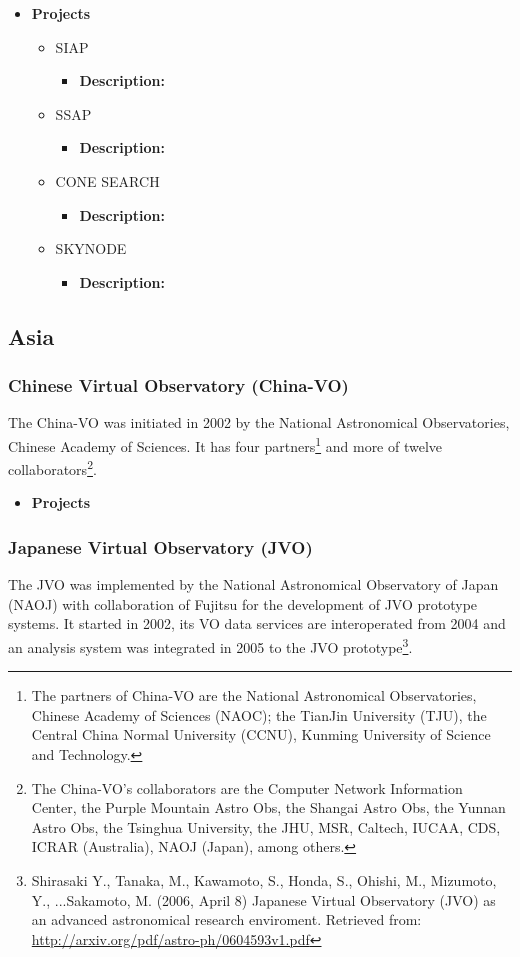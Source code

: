 \begin{itemize}
\item \textbf{Projects}
\begin{itemize}
\item SIAP
\begin{itemize}
\item \textbf{Description:} 
\end{itemize}
\item SSAP
\begin{itemize}
\item \textbf{Description:} 
\end{itemize}
\item CONE SEARCH
\begin{itemize}
\item \textbf{Description:} 
\end{itemize}
\item SKYNODE
\begin{itemize}
\item \textbf{Description:} 
\end{itemize}
\end{itemize}
\end{itemize}

\subsection{Asia}
\subsubsection{Chinese Virtual Observatory (China-VO)}
The China-VO was initiated in 2002 by the National Astronomical Observatories,
Chinese Academy of Sciences. It has four partners\footnote{The partners of
China-VO are the National Astronomical Observatories, Chinese Academy of
Sciences (NAOC); the TianJin University (TJU), the Central China Normal
University (CCNU), Kunming University of Science and Technology.} and more of
twelve collaborators\footnote{The China-VO's collaborators are the Computer
Network Information Center, the Purple Mountain Astro Obs, the Shangai Astro
Obs, the Yunnan Astro Obs, the Tsinghua University, the JHU, MSR, Caltech,
IUCAA, CDS, ICRAR (Australia), NAOJ (Japan), among others.}.

\begin{itemize}
\item \textbf{Projects}
\end{itemize}

\subsubsection{Japanese Virtual Observatory (JVO)}
The JVO was implemented by the National Astronomical Observatory of Japan (NAOJ)
with collaboration of Fujitsu for the development of JVO prototype systems. It
started in 2002, its VO data services are interoperated from 2004 and an
analysis system was integrated in 2005 to the JVO prototype\footnote{Shirasaki
Y., Tanaka, M., Kawamoto, S., Honda, S., Ohishi, M., Mizumoto, Y., ...Sakamoto,
M. (2006, April 8) Japanese Virtual Observatory (JVO) as an advanced
astronomical research enviroment. Retrieved from:
\url{http://arxiv.org/pdf/astro-ph/0604593v1.pdf}}.

